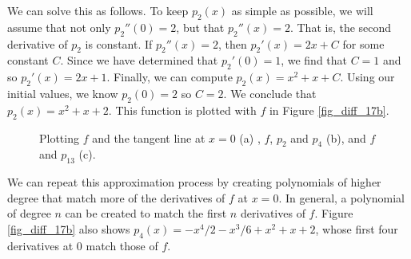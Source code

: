 We can solve this as follows. To keep $p_2(x)$ as simple as possible, we will assume that not only  $p_2''(0)=2$, but that $p_2''(x)=2$. That is, the second derivative of $p_2$ is  constant. If $p_2''(x) = 2$, then $p_2'(x) = 2x+C$ for some constant $C$. Since we have determined that $p_2'(0) = 1$, we find that $C=1$ and so $p_2'(x) = 2x+1$. Finally, we can compute $p_2(x) = x^2+x+C$. Using our initial values, we know $p_2(0) = 2$ so $C=2.$ We conclude that $p_2(x) = x^2+x+2.$ This function is plotted with $f$ in Figure \ref{fig_diff_17b}.

\begin{figure}[t]
\centering
\qquad
{}
\qquad
{}
\caption{Plotting $f$ and the tangent line at $x=0$ (a) , $f$, $p_2$ and $p_4$ (b), and $f$ and $p_{13}$ (c).}
\end{figure}

We can repeat this approximation process by creating polynomials of higher degree that match more of the derivatives of $f$ at $x=0$. In general, a polynomial of degree $n$ can be created to match the first $n$ derivatives of $f$. Figure \ref{fig_diff_17b} also shows $p_4(x)= -x^4/2-x^3/6+x^2+x+2$, whose first four derivatives at 0 match those of $f$. 

